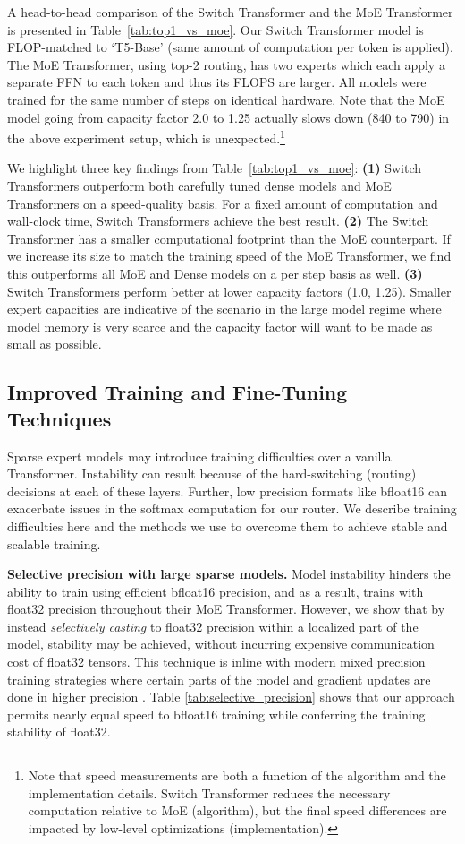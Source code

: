 \documentclass[twoside,11pt]{article}
\begin{document}
A head-to-head comparison of the Switch Transformer and the MoE Transformer is presented in Table~\ref{tab:top1_vs_moe}.
Our Switch Transformer model is FLOP-matched to `T5-Base' \citep{raffel2019exploring} (same amount of computation per token is applied).
The MoE Transformer, using top-2 routing, has two experts which each apply a separate FFN to each token and thus its FLOPS are larger. 
All models were trained for the same number of steps on identical hardware. Note that the MoE model going from capacity factor 2.0 to 1.25 actually slows down (840 to 790) in the above experiment setup, which is unexpected.\footnote{Note that speed measurements are both a function of the algorithm and the implementation details. Switch Transformer reduces the necessary computation relative to MoE (algorithm), but the final speed differences are impacted by low-level optimizations (implementation).}

We highlight three key findings from Table~\ref{tab:top1_vs_moe}: \textbf{(1)} Switch Transformers outperform both carefully tuned dense models and MoE Transformers on a speed-quality basis.
For a fixed amount of computation and wall-clock time, Switch Transformers achieve the best result. 
\textbf{(2)} The Switch Transformer has a smaller computational footprint than the MoE counterpart. If we increase its size to match the training speed of the MoE Transformer, we find this outperforms all MoE and Dense models on a per step basis as well.
\textbf{(3)} Switch Transformers perform better at lower capacity factors (1.0, 1.25).
Smaller expert capacities are indicative of the scenario in the large model regime where model memory is very scarce and the capacity factor will want to be made as small as possible.

\subsection{Improved Training and Fine-Tuning Techniques}
Sparse expert models may introduce training difficulties over a vanilla Transformer.
Instability can result because of the hard-switching (routing) decisions at each of these layers.
Further, low precision formats like bfloat16 \citep{wang2019bfloat16} can exacerbate issues in the softmax computation for our router.
We describe training difficulties here and the methods we use to overcome them to achieve stable and scalable training.

\textbf{Selective precision with large sparse models.} 
Model instability hinders the ability to train using efficient bfloat16 precision, and as a result, \citet{lepikhin2020gshard} trains with float32 precision throughout their MoE Transformer.
However, we show that by instead \emph{selectively casting} to float32 precision within a localized part of the model, stability may be achieved, without incurring expensive communication cost of float32 tensors. This technique is inline with modern mixed precision training strategies where certain parts of the model and gradient updates are done in higher precision \cite{micikevicius2017mixed}.
Table \ref{tab:selective_precision} shows that our approach permits nearly equal speed to bfloat16 training while conferring the training stability of float32.
\end{document}
